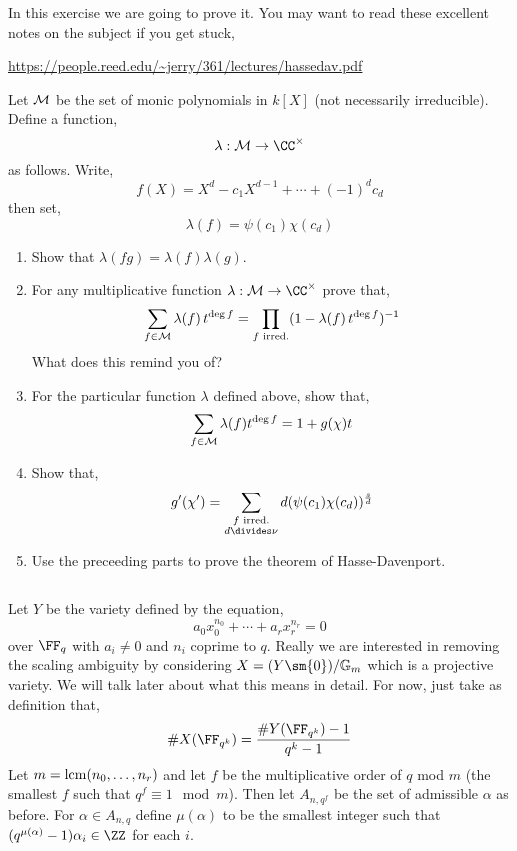 \documentclass[12pt]{article}
\begin{document}
In this exercise we are going to prove it. You may want to read these excellent notes on the subject if you get stuck,

\begin{center}
\url{https://people.reed.edu/~jerry/361/lectures/hassedav.pdf}
\end{center}

Let $\mathcal{M}$ be the set of monic polynomials in $k[X]$ (not necessarily irreducible). Define a function,
\[ \lambda : \M \to \CC^\times \]
as follows. Write,
\[ f(X) = X^d - c_1 X^{d-1} + \cdots + (-1)^d c_d \]
then set,
\[ \lambda(f) = \psi(c_1) \chi(c_d) \]

\begin{enumerate}
\item Show that $\lambda(fg) = \lambda(f) \lambda(g)$.

\item For any multiplicative function $\lambda : \M \to \CC^\times$ prove that,
\[ \sum_{f \in \mathcal{M}} \lambda(f) \, t^{\deg{f}} = \prod_{f \text{ irred.}} (1 - \lambda(f) \, t^{\deg{f}})^{-1} \]
What does this remind you of?

\item For the particular function $\lambda$ defined above, show that,
\[ \sum_{f \in \mathcal{M}} \lambda(f) t^{\deg{f}} = 1 + g(\chi) t \]

\item Show that,
\[ g'(\chi') = \sum_{\substack{f \text{ irred.} \\ d \divides \nu}} d (\psi(c_1) \chi(c_d))^{\frac{s}{d}} \]

\item Use the preceeding parts to prove the theorem of Hasse-Davenport.
\end{enumerate}

\subsection{} \label{proof_of_thm}

Let $Y$ be the variety defined by the equation,
\[ a_0 x_0^{n_0} + \cdots + a_r x_r^{n_r} = 0 \]
over $\FF_q$ with $a_i \neq 0$ and $n_i$ coprime to $q$. Really we are interested in removing the scaling ambiguity by considering $X = (Y \sm \{ 0 \})/\Gm$ which is a projective variety. We will talk later about what this means in detail. For now, just take as definition that,
\[ \# X(\FF_{q^k}) = \frac{\# Y(\FF_{q^k}) - 1}{q^k - 1} \]
Let $m = \mathrm{lcm}{(n_0, \dots, n_r)}$ and let $f$ be the multiplicative order of $q$ mod $m$ (the smallest $f$ such that $q^f \equiv 1 \mod m$). Then let $A_{n,q^f}$ be the set of admissible $\alpha$ as before. For $\alpha \in A_{n,q}$ define $\mu(\alpha)$ to be the smallest integer such that $(q^{\mu(\alpha)}-1) \alpha_i \in \ZZ$ for each $i$.
\end{document}
